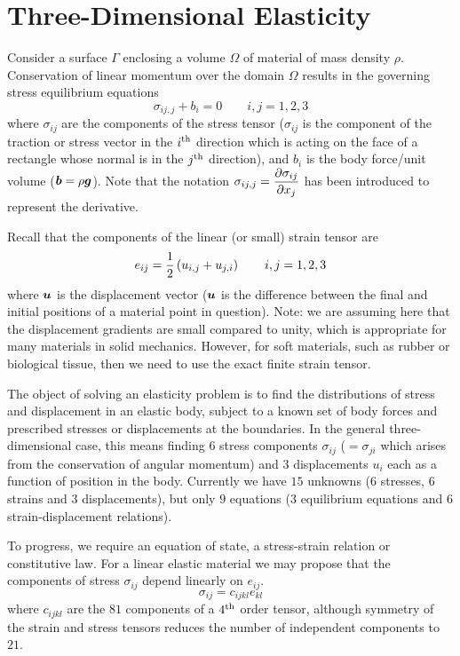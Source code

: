 \section{Three-Dimensional Elasticity}
\label{sec:3Delast}

Consider a surface $\Gamma$ enclosing a volume $\Omega$ of material of mass
density $\rho$.  Conservation of linear momentum over the domain $\Omega$
results in the governing stress equilibrium equations
\begin{equation}
  \sigma_{ij,j} + b_{i} =  0 \qquad i,j=1,2,3
  \label{eqn:equilib}
\end{equation}
where $\sigma_{ij}$ are the components of the stress tensor ($\sigma_{ij}$ is
the component of the traction or stress vector in the ${i}^{\text{th}}$ direction
which is acting on the face of a rectangle whose normal is in the ${j}^{\text{th}}$
direction), and $b_{i}$ is the body force/unit volume (\eg $\vect{b} =
\rho\vect{g}$). Note that the notation $\sigma_{ij,j} =
 \dfrac{\partial \sigma_{ij}}{\partial x_{j}} $ has been introduced to represent the derivative.

Recall that the components of the linear (or small) strain tensor are
\begin{equation}
  e_{ij} =  \dfrac{1}{2}\left( u_{i,j} + u_{j,i} \right) \qquad i,j=1,2,3
  \label{eqn:sst}
\end{equation}
where $\vect{u}$ is the displacement vector (\ie $\vect{u}$ is the difference
between the final and initial positions of a material point in
question). Note: we are assuming here that the displacement gradients are
small compared to unity, which is appropriate for many materials in solid
mechanics.  However, for soft materials, such as rubber or biological tissue,
then we need to use the exact finite strain tensor.

The object of solving an elasticity problem is to find the distributions of
stress and displacement in an elastic body, subject to a known set of body
forces and prescribed stresses or displacements at the boundaries.  In the
general three-dimensional case, this means finding $6$ stress components
$\sigma_{ij}$ ($=\sigma_{ji}$ which arises from the conservation of angular
momentum) and 3 displacements $u_{i}$ each as a function of position in the
body. Currently we have $15$ unknowns ($6$ stresses, $6$ strains and $3$
displacements), but only $9$ equations ($3$ equilibrium equations and $6$
strain-displacement relations).

To progress, we require an equation of state, \ie a stress-strain relation or
constitutive law.  For a linear elastic material we may propose that the
components of stress $\sigma_{ij}$ depend linearly on $e_{ij}$. \ie
\begin{displaymath}
  \sigma_{ij} = c_{ijkl}e_{kl}
\end{displaymath}  
where $c_{ijkl}$ are the $81$ components of a ${4}^{\text{th}}$ order tensor, although
symmetry of the strain and stress tensors reduces the number of independent
components to $21$.

